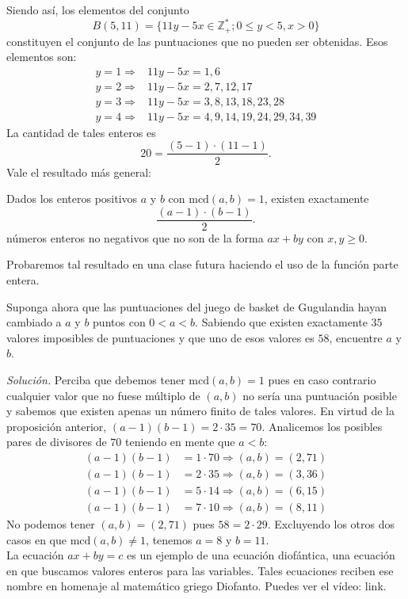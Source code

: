\documentclass[12pt]{scrartcl}
\begin{document}
Siendo así, los elementos del conjunto $$B(5,11)=\{11y-5x\in \mathbb{Z}_+^*;0\le y<5,x>0\}$$
constituyen el conjunto de las puntuaciones que no pueden ser obtenidas. Esos elementos son: \begin{align*}
y=1 \Rightarrow & 11y-5x=1,6\\
y=2 \Rightarrow & 11y-5x=2,7,12,17\\
y=3 \Rightarrow & 11y-5x=3,8,13,18,23,28\\
y=4 \Rightarrow & 11y-5x=4,9,14,19,24,29,34,39
\end{align*}
La cantidad de tales enteros es $$20=\frac{(5-1)\cdot(11-1)}{2}.$$
Vale el resultado más general:
\begin{proposition}
Dados los enteros positivos $a$ y $b$ con $\mbox{mcd}(a,b)=1$, existen exactamente $$\frac{(a-1)\cdot(b-1)}{2}.$$
números enteros no negativos que no son de la forma $ax+by$ con $x,y\ge 0$.
\end{proposition}
Probaremos tal resultado en una clase futura haciendo el uso de la función parte entera.

\begin{example}
Suponga ahora que las puntuaciones del juego de basket de Gugulandia hayan cambiado a $a$ y $b$ puntos con $0<a<b$. Sabiendo que existen exactamente $35$ valores imposibles de puntuaciones y que uno de esos valores es $58$, encuentre $a$ y $b$.
\end{example}

\textit{Solución.} Perciba que debemos tener $\mbox{mcd}(a,b)=1$ pues en caso contrario cualquier valor que no fuese múltiplo de $(a,b)$ no sería una puntuación posible y sabemos que existen apenas un número finito de tales valores. En virtud de la proposición anterior, $(a-1)(b-1)=2\cdot 35=70$. Analicemos los posibles pares de divisores de $70$ teniendo en mente que $a<b$:\begin{align*}
(a-1)(b-1) & = 1\cdot 70 \Rightarrow (a,b)=(2,71)\\
(a-1)(b-1) & = 2\cdot 35 \Rightarrow (a,b)=(3,36)\\
(a-1)(b-1) & = 5\cdot 14 \Rightarrow (a,b)=(6,15)\\
(a-1)(b-1) & = 7\cdot 10 \Rightarrow (a,b)=(8,11)
\end{align*}
No podemos tener $(a,b)=(2,71)$ pues $58=2\cdot 29$. Excluyendo los otros dos casos en que $\mbox{mcd}(a,b)\not =1$, tenemos $a=8$ y $b=11$.\\

La ecuación $ax+by=c$ es un ejemplo de una ecuación diofántica, una ecuación en que buscamos valores enteros para las variables. Tales ecuaciones reciben ese nombre en homenaje al matemático griego Diofanto. Puedes ver el vídeo: link.
\end{document}
